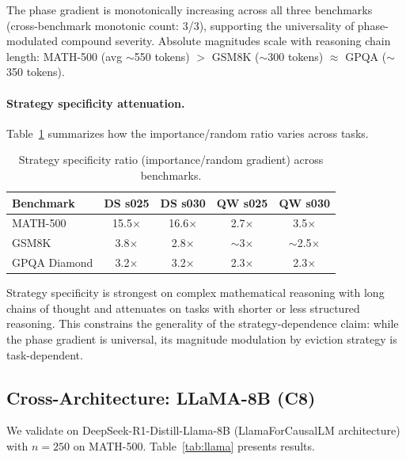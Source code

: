 \documentclass[11pt,a4paper]{article}
\begin{document}
The phase gradient is monotonically increasing across all three benchmarks (cross-benchmark monotonic count: 3/3), supporting the universality of phase-modulated compound severity. Absolute magnitudes scale with reasoning chain length: MATH-500 (avg $\sim$550 tokens) $>$ GSM8K ($\sim$300 tokens) $\approx$ GPQA ($\sim$350 tokens).

\paragraph{Strategy specificity attenuation.} Table~\ref{tab:specificity} summarizes how the importance/random ratio varies across tasks.

\begin{table}[h]
\centering
\caption{Strategy specificity ratio (importance/random gradient) across benchmarks.}
\label{tab:specificity}
\begin{tabular}{lcccc}
\toprule
\textbf{Benchmark} & \textbf{DS s025} & \textbf{DS s030} & \textbf{QW s025} & \textbf{QW s030} \\
\midrule
MATH-500 & 15.5$\times$ & 16.6$\times$ & 2.7$\times$ & 3.5$\times$ \\
GSM8K & 3.8$\times$ & 2.8$\times$ & $\sim$3$\times$ & $\sim$2.5$\times$ \\
GPQA Diamond & 3.2$\times$ & 3.2$\times$ & 2.3$\times$ & 2.3$\times$ \\
\bottomrule
\end{tabular}
\end{table}

Strategy specificity is strongest on complex mathematical reasoning with long chains of thought and attenuates on tasks with shorter or less structured reasoning. This constrains the generality of the strategy-dependence claim: while the phase gradient is universal, its magnitude modulation by eviction strategy is task-dependent.

\subsection{Cross-Architecture: LLaMA-8B (C8)}
\label{sec:llama}

We validate on DeepSeek-R1-Distill-Llama-8B (LlamaForCausalLM architecture) with $n=250$ on MATH-500. Table~\ref{tab:llama} presents results.
\end{document}

